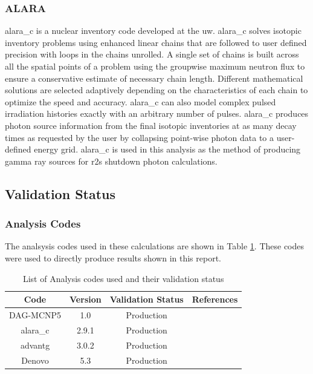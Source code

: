 \documentclass[12pt]{article}
\begin{document}
\subsubsection{ALARA}
\gls{alara_c} \cite{alara} is a nuclear inventory code developed at the \gls{uw}. 
\gls{alara_c} solves isotopic inventory problems using enhanced linear chains 
that are followed to user defined precision with loops in the chains unrolled.
A single set of chains is built across all the spatial points of a problem
using the groupwise maximum neutron flux to ensure a conservative estimate of
necessary chain length.  Different mathematical solutions are selected adaptively 
depending on the characteristics of each chain to optimize the speed and accuracy.  
\gls{alara_c} can also model
complex pulsed irradiation histories exactly with an arbitrary number of
pulses. \gls{alara_c} produces photon source information from the final
isotopic inventories at as many decay times as requested by the user by
collapsing point-wise photon data to a user-defined energy
grid.  \gls{alara_c} is used in this analysis as the method of producing gamma
ray sources for \gls{r2s} shutdown photon calculations.

\subsection{Validation Status}
\subsubsection*{Analysis Codes}
The analsysis codes used in these calculations are shown in Table 
\ref{table:validation}. These codes were used to directly produce results shown
in this report.
\begin{centering}
 \begin{table}[ht!]
  \begin{tabular}{c | c | c | c}
  \hline
  Code & Version & Validation Status & References \\
  \hline 
  DAG-MCNP5 & 1.0 & Production & \cite{dagmc_validation}\\
  \gls{alara_c} & 2.9.1 & Production & \cite{alara}\\
  \gls{advantg} & 3.0.2 & Production & \cite{advantg}\\
  Denovo & 5.3 & Production & \cite{denovo} \\
  \end{tabular}
 \caption{List of Analysis codes used and their validation status}
 \label{table:validation}
 \end{table}
\end{centering}
\end{document}

